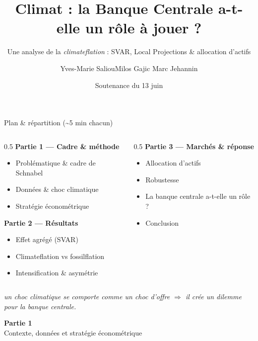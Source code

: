 \documentclass[11pt,aspectratio=169]{beamer}
\title{\textbf{Climat : la Banque Centrale a-t-elle un rôle à jouer ?}}
\subtitle{Une analyse de la \emph{climateflation} : SVAR, Local Projections \& allocation d'actifs}
\author{Yves-Marie Saliou\quad\textperiodcentered\quad Milos Gajic \quad\textperiodcentered\quad Marc Jehannin}
\institute{Université Paris-Dauphine -- PSL \\ Master Ingénierie Économique \& Financière}
\date{Soutenance du 13 juin}
\begin{document}
{
\begin{frame}\titlepage\end{frame}}

\begin{frame}{Plan \& répartition (\textasciitilde 5 min chacun)}
\begin{columns}[T]
\begin{column}{0.5\textwidth}
\textbf{\color{dauphblue}Partie 1 — Cadre \& méthode}
\begin{itemize}\small
\item Problématique \& cadre de Schnabel
\item Données \& choc climatique
\item Stratégie économétrique
\end{itemize}
\vspace{0.4em}
\textbf{\color{dauphblue}Partie 2 — Résultats}
\begin{itemize}\small
\item Effet agrégé (SVAR)
\item Climateflation vs fossilflation
\item Intensification \& asymétrie
\end{itemize}
\end{column}
\begin{column}{0.5\textwidth}
\textbf{\color{dauphblue}Partie 3 — Marchés \& réponse}
\begin{itemize}\small
\item Allocation d'actifs
\item Robustesse
\item La banque centrale a-t-elle un rôle ?
\item Conclusion
\end{itemize}
\end{column}
\end{columns}
\vfill
\centering\small\emph{un choc climatique se comporte comme un choc d'offre $\Rightarrow$ il crée un dilemme pour la banque centrale.}
\end{frame}

\begin{frame}[plain]
\begin{center}
{\color{dauphblue}\Large\textbf{Partie 1}}\\[0.4em]
{\large Contexte, données et stratégie économétrique}
\end{center}
\end{frame}
\end{document}
